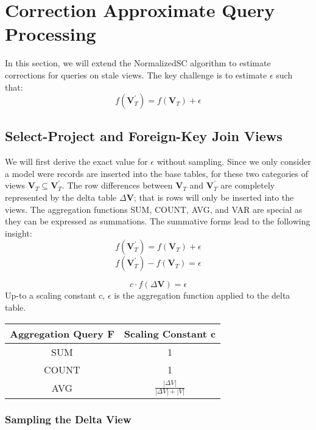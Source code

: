 \section{Correction Approximate Query Processing}

In this section, we will extend the NormalizedSC algorithm to estimate
corrections for queries on stale views. The key challenge is to estimate
$\epsilon$ such that:
\[
f(\textbf{V}_{T}^{'})=f(\textbf{V}_{T})+\epsilon
\]



\subsection{Select-Project and Foreign-Key Join Views}

We will first derive the exact value for $\epsilon$ without sampling.
Since we only consider a model were records are inserted into the
base tables, for these two categories of views $\textbf{V}_{T}\subseteq\textbf{V}_{T}^{'}$.
The row differences between $\textbf{V}_{T}$ and $\textbf{V}_{T}^{'}$
are completely represented by the delta table $\Delta\textbf{V}$;
that is rows will only be inserted into the views. The aggregation
functions SUM, COUNT, AVG, and VAR are special as they can be expressed
as summations. The summative forms lead to the following insight:
\[
f(\textbf{V}_{T}^{'})=f(\textbf{V}_{T})+\epsilon
\]
\[
f(\textbf{V}_{T}^{'})-f(\textbf{V}_{T})=\epsilon
\]


\[
c\cdot f(\Delta\textbf{V})=\epsilon
\]
Up-to a scaling constant c, $\epsilon$ is the aggregation function
applied to the delta table. 

\begin{center}
\begin{tabular}{|c|c|}
\hline 
Aggregation Query F & Scaling Constant c\tabularnewline
\hline 
\hline 
SUM & 1\tabularnewline
\hline 
COUNT & 1\tabularnewline
\hline 
AVG & $\frac{|\Delta V|}{|\Delta V|+|V|}$\tabularnewline
\hline 
\end{tabular}
\par\end{center}


\subsubsection{Sampling the Delta View}

